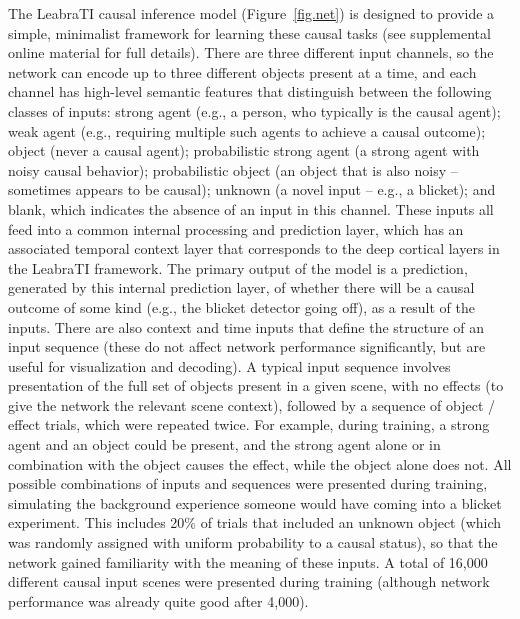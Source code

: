 \documentclass[11pt,twoside]{article}
\newif\myifpdf
\begin{document}
The LeabraTI causal inference model (Figure~\ref{fig.net}) is designed to provide a simple, minimalist framework for learning these causal tasks (see supplemental online material for full details).  There are three different input channels, so the network can encode up to three different objects present at a time, and each channel has high-level semantic features that distinguish between the following classes of inputs: strong agent (e.g., a person, who typically is the causal agent); weak agent (e.g., requiring multiple such agents to achieve a causal outcome); object (never a causal agent); probabilistic strong agent (a strong agent with noisy causal behavior); probabilistic object (an object that is also noisy -- sometimes appears to be causal); unknown (a novel input -- e.g., a blicket); and blank, which indicates the absence of an input in this channel.  These inputs all feed into a common internal processing and prediction layer, which has an associated temporal context layer that corresponds to the deep cortical layers in the LeabraTI framework.  The primary output of the model is a prediction, generated by this internal prediction layer, of whether there will be a causal outcome of some kind (e.g., the blicket detector going off), as a result of the inputs.  There are also context and time inputs that define the structure of an input sequence (these do not affect network performance significantly, but are useful for visualization and decoding).  A typical input sequence involves presentation of the full set of objects present in a given scene, with no effects (to give the network the relevant scene context), followed by a sequence of object / effect trials, which were repeated twice.  For example, during training, a strong agent and an object could be present, and the strong agent alone or in combination with the object causes the effect, while the object alone does not.  All possible combinations of inputs and sequences were presented during training, simulating the background experience someone would have coming into a blicket experiment.  This includes 20\% of trials that included an unknown object (which was randomly assigned with uniform probability to a causal status), so that the network gained familiarity with the meaning of these inputs.  A total of 16,000 different causal input scenes were presented during training (although network performance was already quite good after 4,000).
\end{document}
